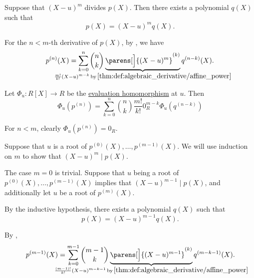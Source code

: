\begin{defproof}
   Suppose that \( (X - u)^m \) divides \( p(X) \). Then there exists a polynomial \( q(X) \) such that
  \begin{equation*}
    p(X) = (X - u)^m q(X).
  \end{equation*}

  For the \( n < m \)-th derivative of \( p(X) \), by , we have
  \begin{equation*}
    p^{(n)}(X) = \sum_{k=0}^n \binom n k \underbrace{\parens[\Big]{ (X - u)^m }^{(k)}}_{\mathclap{\frac {m!} {k!} (X - u)^{m-k} \T*{by} \ref{thm:def:algebraic_derivative/affine_power}}} q^{(n-k)}(X).
  \end{equation*}

  Let \( \Phi_u: R[X] \to R \) be the \hyperref[thm:polynomial_algebra_universal_property]{evaluation homomorphism} at \( u \). Then
  \begin{equation*}
    \Phi_u(p^{(n)}) = \sum_{k=0}^n \binom n k \frac {m!} {k!} 0_R^{m-k} \Phi_u(q^{(n-k)})
  \end{equation*}

  For \( n < m \), clearly \( \Phi_u(p^{(n)}) = 0_R \).

   Suppose that \( u \) is a root of \( p^{(0)}(X), \ldots, p^{(m-1)}(X) \). We will use induction on \( m \) to show that \( (X - u)^m \mid p(X) \).

  The case \( m = 0 \) is trivial. Suppose that \( u \) being a root of \( p^{(0)}(X), \ldots, p^{(m-1)}(X) \) implies that \( (X - u)^{m-1} \mid p(X) \), and additionally let \( u \) be a root of \( p^{(m)}(X) \).

  By the inductive hypothesis, there exists a polynomial \( q(X) \) such that
  \begin{equation*}
    p(X) = (X - u)^{m-1} q(X).
  \end{equation*}

  By ,
  \begin{equation*}
    p^{(m-1)}(X) = \sum_{k=0}^{m-1} \binom {m-1} k \underbrace{\parens[\Big]{ (X - u)^{m - 1} }^{(k)}}_{\mathclap{\frac {(m - 1)!} {k!} (X - u)^{m - k - 1} \T*{by} \ref{thm:def:algebraic_derivative/affine_power}}} q^{(m - k - 1)}(X).
  \end{equation*}


\end{defproof}
